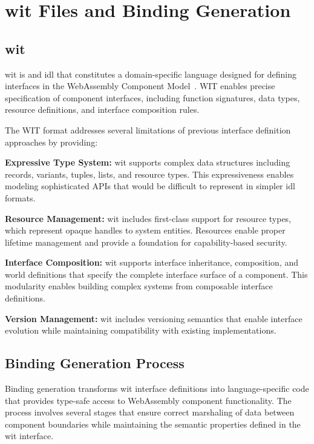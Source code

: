\section{\acrshort{wit} Files and Binding Generation}
\label{sec:wit-binding}

\subsection{\acrfull{wit}}
\label{subsec:wit-overview}

\acrshort{wit} is and \acrshort{idl} that constitutes a domain-specific language designed for defining interfaces in the WebAssembly Component Model~\cite{wit_specification}. WIT enables precise specification of component interfaces, including function signatures, data types, resource definitions, and interface composition rules.

The WIT format addresses several limitations of previous interface definition approaches by providing:

\textbf{Expressive Type System:} \acrshort{wit} supports complex data structures including records, variants, tuples, lists, and resource types. This expressiveness enables modeling sophisticated APIs that would be difficult to represent in simpler \acrshort{idl} formats.

\textbf{Resource Management:} \acrshort{wit} includes first-class support for resource types, which represent opaque handles to system entities. Resources enable proper lifetime management and provide a foundation for capability-based security.

\textbf{Interface Composition:} \acrshort{wit} supports interface inheritance, composition, and world definitions that specify the complete interface surface of a component. This modularity enables building complex systems from composable interface definitions.

\textbf{Version Management:} \acrshort{wit} includes versioning semantics that enable interface evolution while maintaining compatibility with existing implementations.

\subsection{Binding Generation Process}
\label{subsec:binding-generation}

Binding generation transforms \acrshort{wit} interface definitions into language-specific code that provides type-safe access to WebAssembly component functionality. The process involves several stages that ensure correct marshaling of data between component boundaries while maintaining the semantic properties defined in the \acrshort{wit} interface.

